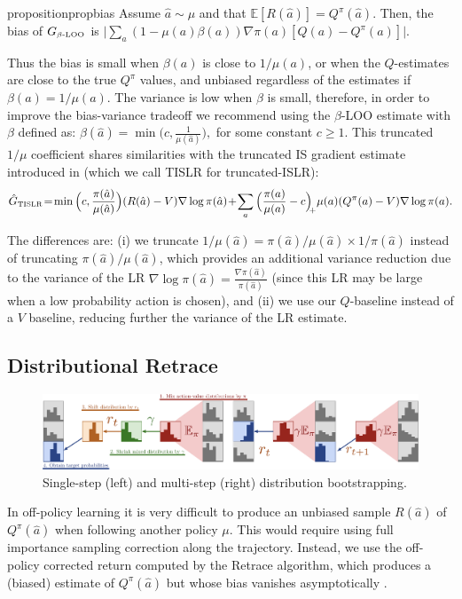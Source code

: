 \documentclass{article}
\newcommand{\beqan}{\begin{eqnarray*}}
\newcommand{\eeqan}{\end{eqnarray*}}
\newcommand{\E}{{\mathbb E}}
\newcommand{\action}{{\hat a}}
\begin{document}
\begin{restatable}{proposition}{propbias}\label{prop:bias}
Assume $\action\sim \mu$ and that $\E[R(\action)]=Q^{\pi}(\action)$. Then, 
the bias of $G_{\mbox{\tiny $\beta$-LOO}}$ is $\big| \sum_a (1-\mu(a)\beta(a)) 
\nabla\pi(a) [Q(a)-Q^{\pi}(a)]\big|$.
\end{restatable}
Thus the bias is small when $\beta(a)$ is close to $1/\mu(a)$, or 
when the $Q$-estimates are close to the true $Q^{\pi}$ values, and unbiased
regardless of the estimates if $\beta(a) = 1/\mu(a)$. The variance 
is low when $\beta$ is small, therefore, in order to improve the bias-variance tradeoff 
we recommend using the $\beta$-LOO estimate with $\beta$ defined as:
$\beta(\action) = \min\big( c, \frac{1}{\mu(\action)}\big),$ for some constant
$c\geq 1$. This truncated $1/\mu$ coefficient shares similarities with the truncated IS 
gradient estimate introduced in \citep{wang2017sample} (which we call TISLR for 
truncated-ISLR):
\beqan
\hat G_{\mbox{\tiny TISLR}}\! = \!\min\Big(c, \frac{\pi(\action)}{\mu(\action)}\Big) 
(R(\action) - V) \nabla\log\pi(\action)  \! + \! \sum_a \Big( \frac{\pi(a)}{\mu(a)}-c 
\Big)_{\!\! +} \mu(a) 
(Q^{\pi}(a) - V) \nabla\log\pi(a) .
\eeqan

The differences are: (i) we truncate $1/\mu(\action) = \pi(\action)/\mu(\action)\times 1/\pi(\action)$ 
instead of truncating $ \pi(\action)/\mu(\action)$, which provides an additional variance 
reduction due to the variance of the LR 
$\nabla\log\pi(\action)=\frac{\nabla\pi(\action)}{\pi(\action)}$ (since this LR may be large when 
a low probability action is chosen), and (ii) we use our $Q$-baseline instead 
of a $V$ baseline, reducing further the variance of the LR estimate.

\subsection{Distributional Retrace}\label{sec:dist_retrace}
\begin{figure}
\centering
\includegraphics[width=1.0\textwidth]{dist_bootstrap}
  \caption{Single-step (left) and multi-step (right) distribution bootstrapping.}
  \label{distributions-multi-step}
\end{figure}
In off-policy learning it is very difficult to produce an 
unbiased sample $R(\action)$ of $Q^{\pi}(\action)$ when following another policy $\mu$. 
This would require using full importance sampling correction along the 
trajectory.  Instead, we use the off-policy corrected return computed 
by the Retrace algorithm, which produces a (biased) estimate of $Q^{\pi}(\action)$ 
but whose bias vanishes asymptotically \citep{munos2016safe}.
\end{document}

